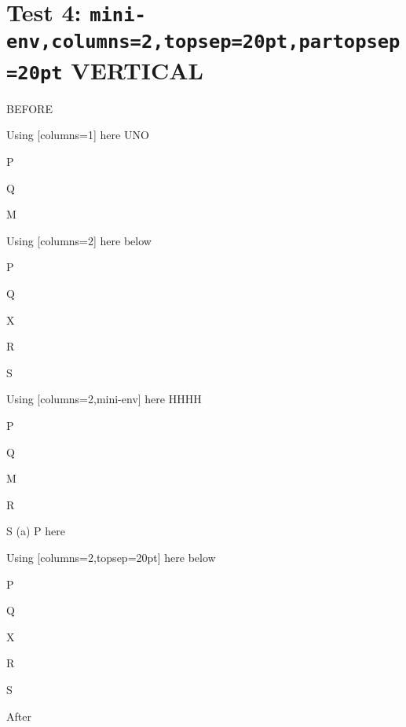 \documentclass[12pt]{article}
\begin{document}
\newpage

\section{Test 4: \texttt{mini-env,columns=2,topsep=20pt,partopsep=20pt} VERTICAL}

BEFORE
\begin{enumext}[columns=2]
\item Using [columns=1] here UNO

  \begin{enumext}[columns=1,topsep=20pt,partopsep=20pt]%
     \item  P \item Q \item M %
  \end{enumext}

\item Using [columns=2] here below

\begin{enumext}[columns=2,topsep=20pt,,partopsep=20pt]%
     \item  P \item Q \item X  \item R \item S
  \end{enumext}

\columnbreak

\item Using [columns=2,mini-env] here HHHH

  \begin{enumext}[columns=2,mini-env={0.4\linewidth},topsep=20pt,partopsep=20pt]%
    \item  P \item Q \item M \item R \item S
    \miniright
    (a) P here
  \end{enumext}

\item Using [columns=2,topsep=20pt] here below

\begin{enumext}[columns=2,topsep=20pt,partopsep=20pt]%
     \item  P \item Q \item X  \item R \item S
  \end{enumext}

\end{enumext}
After
\end{document}
